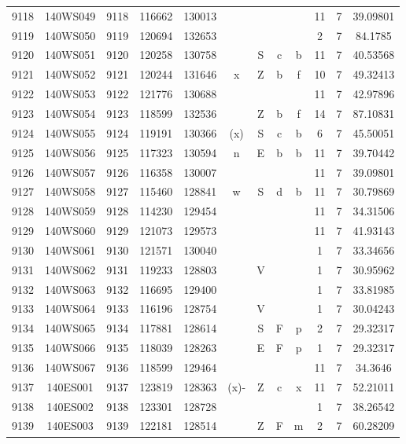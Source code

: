 \begin{tabular}{|*{12}{c|}}
9118 & 140WS049 & 9118 & 116662 & 130013 &  &  &  &  & 11 & 7 & 39.09801 \\ 
9119 & 140WS050 & 9119 & 120694 & 132653 &  &  &  &  & 2 & 7 & 84.1785 \\ 
9120 & 140WS051 & 9120 & 120258 & 130758 &  & S & c & b & 11 & 7 & 40.53568 \\ 
9121 & 140WS052 & 9121 & 120244 & 131646 & x & Z & b & f & 10 & 7 & 49.32413 \\ 
9122 & 140WS053 & 9122 & 121776 & 130688 &  &  &  &  & 11 & 7 & 42.97896 \\ 
9123 & 140WS054 & 9123 & 118599 & 132536 &  & Z & b & f & 14 & 7 & 87.10831 \\ 
9124 & 140WS055 & 9124 & 119191 & 130366 & (x) & S & c & b & 6 & 7 & 45.50051 \\ 
9125 & 140WS056 & 9125 & 117323 & 130594 & n & E & b & b & 11 & 7 & 39.70442 \\ 
9126 & 140WS057 & 9126 & 116358 & 130007 &  &  &  &  & 11 & 7 & 39.09801 \\ 
9127 & 140WS058 & 9127 & 115460 & 128841 & w & S & d & b & 11 & 7 & 30.79869 \\ 
9128 & 140WS059 & 9128 & 114230 & 129454 &  &  &  &  & 11 & 7 & 34.31506 \\ 
9129 & 140WS060 & 9129 & 121073 & 129573 &  &  &  &  & 11 & 7 & 41.93143 \\ 
9130 & 140WS061 & 9130 & 121571 & 130040 &  &  &  &  & 1 & 7 & 33.34656 \\ 
9131 & 140WS062 & 9131 & 119233 & 128803 &  & V &  &  & 1 & 7 & 30.95962 \\ 
9132 & 140WS063 & 9132 & 116695 & 129400 &  &  &  &  & 1 & 7 & 33.81985 \\ 
9133 & 140WS064 & 9133 & 116196 & 128754 &  & V &  &  & 1 & 7 & 30.04243 \\ 
9134 & 140WS065 & 9134 & 117881 & 128614 &  & S & F & p & 2 & 7 & 29.32317 \\ 
9135 & 140WS066 & 9135 & 118039 & 128263 &  & E & F & p & 1 & 7 & 29.32317 \\ 
9136 & 140WS067 & 9136 & 118599 & 129464 &  &  &  &  & 11 & 7 & 34.3646 \\ 
9137 & 140ES001 & 9137 & 123819 & 128363 & (x)- & Z & c & x & 11 & 7 & 52.21011 \\ 
9138 & 140ES002 & 9138 & 123301 & 128728 &  &  &  &  & 1 & 7 & 38.26542 \\ 
9139 & 140ES003 & 9139 & 122181 & 128514 &  & Z & F & m & 2 & 7 & 60.28209 \\ 

\end{tabular}
